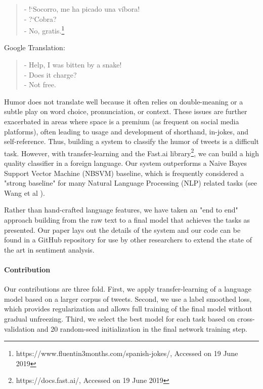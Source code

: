 \documentclass[runningheads]{llncs}
\begin{document}
\begin{quote}
- !`Socorro, me ha picado una víbora!\\
- ?`Cobra?\\
- No, gratis.\footnote{https://www.fluentin3months.com/spanish-jokes/, Accessed on 19 June 2019}
\end{quote}
Google Translation:
\begin{quote}
- Help, I was bitten by a snake!\\
- Does it charge?\\
- Not free.
\end{quote}
Humor does not translate well because it often relies on double-meaning or a subtle play on word choice, pronunciation, or context.  These issues are further exacerbated in areas where space is a premium (as frequent on social media platforms), often leading to usage and development of shorthand, in-jokes, and self-reference. Thus, building a system to classify the humor of tweets is a difficult task.  However, with transfer-learning and the Fast.ai library\footnote{https://docs.fast.ai/, Accessed on 19 June 2019}, we can build a high quality classifier in a foreign language. Our system outperforms a Naive Bayes Support Vector Machine (NBSVM) baseline, which is frequently considered a "strong baseline" for many Natural Language Processing (NLP) related tasks (see 
Wang et al \cite{Wang:2012:BBS:2390665.2390688}).

Rather than hand-crafted language features, we have taken an "end to end" approach building from the raw text to a final model that achieves the tasks as presented.  Our paper lays out the details of the system and our code can be found in a GitHub repository for use by other researchers to extend the state of the art in sentiment analysis. 

\paragraph{Contribution} Our contributions are three fold.  First, we apply transfer-learning of a language model based on a larger corpus of tweets.  Second, we use a label smoothed loss, which provides regularization and allows full training of the final model without gradual unfreezing.  Third, we select the best model for each task based on cross-validation and 20 random-seed initialization in the final network training step.
\end{document}
